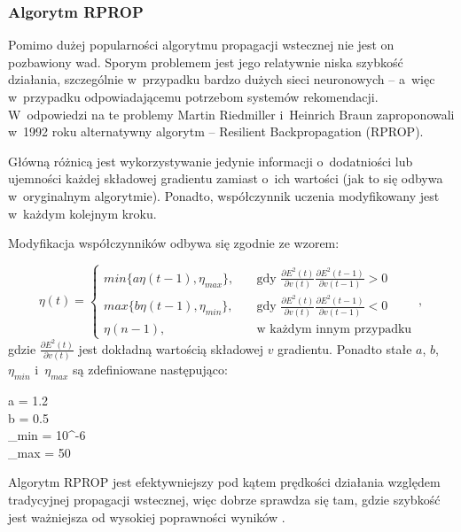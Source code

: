 \documentclass[twoside]{iisthesis}
\begin{document}
	 \subsubsection{Algorytm RPROP}		 
	 
	 Pomimo dużej popularności algorytmu propagacji wstecznej nie jest on pozbawiony wad. Sporym problemem jest jego relatywnie niska szybkość działania, szczególnie w~przypadku bardzo dużych sieci neuronowych -- a~więc w~przypadku odpowiadającemu potrzebom systemów rekomendacji. W~odpowiedzi na te problemy Martin Riedmiller i~Heinrich Braun zaproponowali w~1992 roku alternatywny algorytm -- Resilient Backpropagation (RPROP).
	 
	 Główną różnicą jest wykorzystywanie jedynie informacji o~dodatniości lub ujemności każdej składowej gradientu zamiast o~ich wartości (jak to się odbywa w~oryginalnym algorytmie). Ponadto, współczynnik uczenia modyfikowany jest w~każdym kolejnym kroku. 
	 
	 Modyfikacja współczynników odbywa się zgodnie ze wzorem:
	 
	 \begin{equation}
	 \label{eq:rprop}		 
	 \eta(t) = 
	 \begin{cases}
	 min\{a \eta(t-1), \eta_{max}\}, & \quad \text{gdy } \frac{\partial E^2(t)}{\partial v(t)} \frac{\partial E^2(t-1)}{\partial v(t-1)} > 0 \\
	 max\{b \eta(t-1), \eta_{min}\}, & \quad \text{gdy } \frac{\partial E^2(t)}{\partial v(t)} \frac{\partial E^2(t-1)}{\partial v(t-1)} < 0 \\
	 \eta(n-1), & \quad \text{w każdym innym przypadku} 
	 \end{cases}		 
	 \,,
	 \end{equation}		 
	 gdzie $\frac{\partial E^2(t)}{\partial v(t)}$ jest dokładną wartością składowej $v$ gradientu. Ponadto stałe $a$, $b$, $\eta_{min}$ i~$\eta_{max}$ są zdefiniowane następująco:
	 
	 \begin{conditions*}
			 	a = 1.2 \\
			 	b = 0.5 \\
			 	\eta_{min} = 10^{-6} \\
			 	\eta_{max} = 50
	 \end{conditions*} 
	 
	 Algorytm RPROP jest efektywniejszy pod kątem prędkości działania względem tradycyjnej propagacji wstecznej, więc dobrze sprawdza się tam, gdzie szybkość jest ważniejsza od wysokiej poprawności wyników \cite{riedmiller1993direct,riedmiller1994rprop}.
	 
\end{document}
